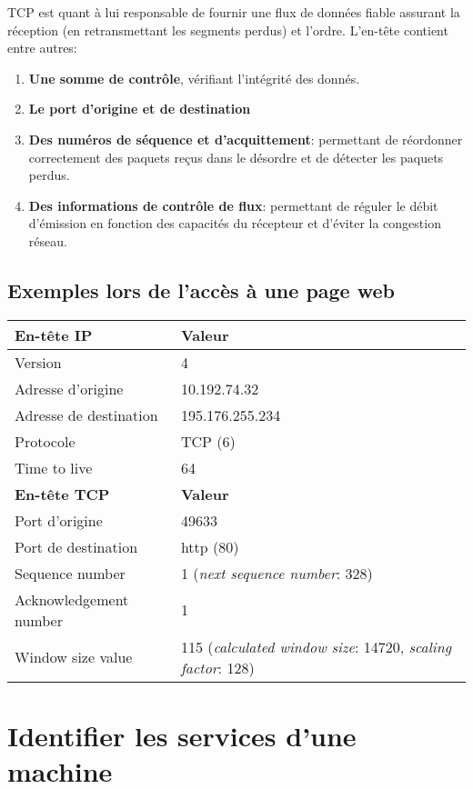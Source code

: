 \documentclass[11pt,a4paper]{article}
\begin{document}
TCP est quant à lui responsable de fournir une flux de données fiable assurant la réception (en retransmettant les segments perdus) et l'ordre. L'en-tête contient entre autres:

\begin{enumerate}
	\item \textbf{Une somme de contrôle}, vérifiant l'intégrité des donnés.
	\item \textbf{Le port d'origine et de destination}
	\item \textbf{Des numéros de séquence et d'acquittement}: permettant de réordonner correctement des paquets reçus dans le désordre et de détecter les paquets perdus.
	\item \textbf{Des informations de contrôle de flux}: permettant de réguler le débit d'émission en fonction des capacités du récepteur et d'éviter la congestion réseau.
\end{enumerate}

\subsection{Exemples lors de l'accès à une page web}

\begin{tabular}{|l|p{10.3cm}|}
	\hline
	\textbf{En-tête IP} & \textbf{Valeur} \\
	\hline
	Version & 4 \\
	Adresse d'origine & 10.192.74.32 \\
	Adresse de destination & 195.176.255.234 \\
	Protocole & TCP (6) \\
	Time to live & 64 \\
	\hline
	\hline
	\textbf{En-tête TCP} & \textbf{Valeur} \\
	\hline
	Port d'origine & 49633 \\
	Port de destination & http (80) \\
	Sequence number & 1 (\textit{next sequence number}: 328) \\
	Acknowledgement number & 1 \\
	Window size value & 115 (\textit{calculated window size}: 14720, \textit{scaling factor}: 128) \\
	\hline
\end{tabular}

\section{Identifier les services d'une machine}
\end{document}
